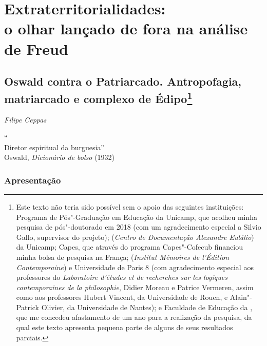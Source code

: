 \part{Extraterritorialidades:\\ o olhar lançado de fora na análise de Freud}

\chapter*{Oswald contra o Patriarcado. Antropofagia, matriarcado e
complexo de Édipo\footnote{Este texto não teria sido possível sem o
  apoio das seguintes instituições: Programa de Pós"-Graduação em
  Educação da Unicamp, que acolheu minha pesquisa de pós"-doutorado em
  2018 (com um agradecimento especial a Silvio Gallo, supervisor do
  projeto);  (\emph{Centro de Documentação Alexandre Eulálio}) da
  Unicamp; Capes, que através do programa Capes"-Cofecub financiou minha
  bolsa de pesquisa na França;  (\emph{Institut Mémoires de
  l'Édition Contemporaine}) e Universidade de Paris 8 (com agradecimento
  especial aos professores do \emph{Laboratoire d'études et de
  recherches sur les logiques contemporaines de la philosophie}, Didier
  Moreau e Patrice Vermeren, assim como aos professores Hubert Vincent,
  da Universidade de Rouen, e Alain"-Patrick Olivier, da Universidade de
  Nantes); e Faculdade de Educação da , que me concedeu afastamento
  de um ano para a realização da pesquisa, da qual este texto apresenta
  pequena parte de alguns de seus resultados parciais.}}

\begin{flushright}
\emph{Filipe Ceppas}
\end{flushright}

\begin{flushright}
\footnotesize
``\\
Diretor espiritual da burguesia''\\
Oswald, \emph{Dicionário de bolso} (1932)
\end{flushright}

\section{Apresentação}

